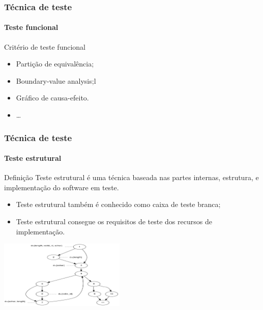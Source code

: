 \begin{frame}
\frametitle{Técnica de teste}
\framesubtitle{Teste funcional}

\begin{block:fact}{Critério de teste funcional}
\begin{itemize}
	\item Partição de equivalência;
	\item Boundary-value analysis;l
	\item Gráfico de causa-efeito.
	\item \ldots
\end{itemize}
\end{block:fact}
\end{frame}



\begin{frame}
\frametitle{Técnica de teste}
\framesubtitle{Teste estrutural}

\begin{block:concept}{Definição}
Teste estrutural é uma técnica baseada nas partes internas, estrutura, e implementação do software em teste.
\end{block:concept}


\begin{block:fact}{}
\begin{itemize}
	\item Teste estrutural também é conhecido como caixa de teste branca;

	\item Teste estrutural consegue os requisitos de teste dos recursos de implementação.
\end{itemize}
\end{block:fact}

\begin{block:fact}{}
    \centering
    \includegraphics[width=6cm]{teste-de-software/conceitos-basicos/Imagens/structural-testing}
\end{block:fact}
\end{frame}


